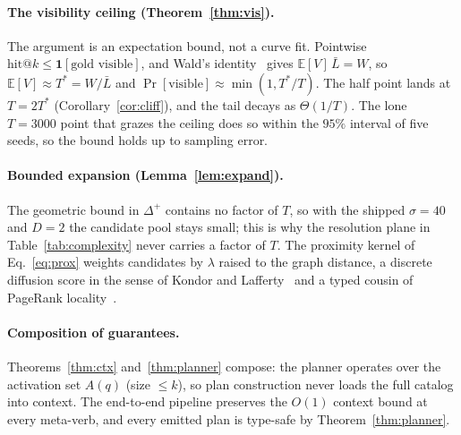 \documentclass[11pt]{article}
\theoremstyle{plain}
\theoremstyle{definition}
\begin{document}
\paragraph{The visibility ceiling (Theorem~\ref{thm:vis}).} The argument is an
expectation bound, not a curve fit. Pointwise $\text{hit@}k \le
\mathbf{1}[\text{gold visible}]$, and Wald's identity~\citep{wald1947sequential}
gives $\mathbb{E}[V]\,\bar L = W$, so $\mathbb{E}[V]\approx T^{*}=W/\bar L$ and
$\Pr[\text{visible}]\approx\min(1,T^{*}/T)$. The half point lands at $T=2T^{*}$
(Corollary~\ref{cor:cliff}), and the tail decays as $\Theta(1/T)$. The lone
$T{=}3000$ point that grazes the ceiling does so within the $95\%$ interval of
five seeds, so the bound holds up to sampling error.

\paragraph{Bounded expansion (Lemma~\ref{lem:expand}).} The geometric bound in
$\Delta^{+}$ contains no factor of $T$, so with the shipped $\sigma=40$ and
$D=2$ the candidate pool stays small; this is why the resolution plane in
Table~\ref{tab:complexity} never carries a factor of $T$. The proximity kernel of
Eq.~\eqref{eq:prox} weights candidates by $\lambda$ raised to the graph distance,
a discrete diffusion score in the sense of Kondor and
Lafferty~\citep{kondor2002diffusion} and a typed cousin of PageRank
locality~\citep{page1999pagerank}.

\paragraph{Composition of guarantees.} Theorems~\ref{thm:ctx}
and~\ref{thm:planner} compose: the planner operates over the activation set
$A(q)$ (size $\le k$), so plan construction never loads the full catalog into
context. The end-to-end pipeline preserves the $O(1)$ context bound at every
meta-verb, and every emitted plan is type-safe by Theorem~\ref{thm:planner}.



\end{document}
